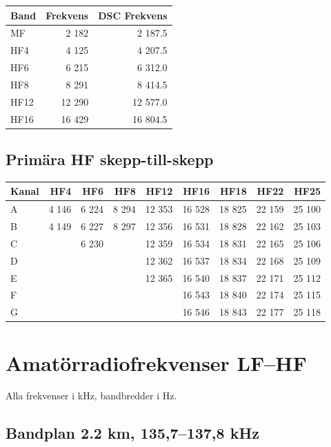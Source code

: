 \begin{longtable}{lrr}
\textbf{Band} & \textbf{Frekvens} & \textbf{DSC Frekvens}\\ \hline \endhead

MF   & 2 182  & 2 187.5  \\
HF4  & 4 125  & 4 207.5  \\
HF6  & 6 215  & 6 312.0  \\
HF8  & 8 291  & 8 414.5  \\
HF12 & 12 290 & 12 577.0 \\
HF16 & 16 429 & 16 804.5 \\
\end{longtable}

\subsection{Primära HF skepp-till-skepp}

\begin{longtable}{lrrrrrrrr}
\textbf{Kanal} & \textbf{HF4} & \textbf{HF6} & \textbf{HF8} &
               \textbf{HF12} & \textbf{HF16} & \textbf{HF18} &
               \textbf{HF22} & \textbf{HF25} \\
\hline
\endhead

A & 4 146 & 6 224 & 8 294 & 12 353 & 16 528 & 18 825 & 22 159 & 25 100 \\
B & 4 149 & 6 227 & 8 297 & 12 356 & 16 531 & 18 828 & 22 162 & 25 103 \\
C &       & 6 230 &       & 12 359 & 16 534 & 18 831 & 22 165 & 25 106 \\
D &       &       &       & 12 362 & 16 537 & 18 834 & 22 168 & 25 109 \\
E &       &       &       & 12 365 & 16 540 & 18 837 & 22 171 & 25 112 \\
F &       &       &       &        & 16 543 & 18 840 & 22 174 & 25 115 \\
G &       &       &       &        & 16 546 & 18 843 & 22 177 & 25 118 \\
\end{longtable}

\section{Amatörradiofrekvenser LF--HF}

Alla frekvenser i kHz, bandbredder i Hz.

\subsection{Bandplan 2.2 km, 135,7--137,8 kHz}

